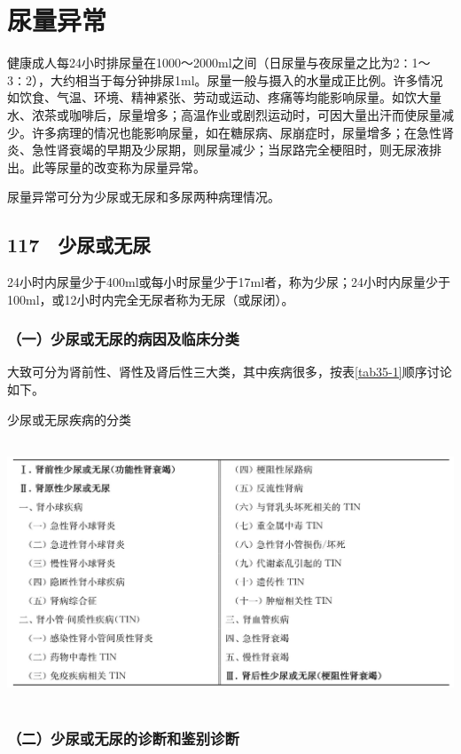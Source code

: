 \chapter{尿量异常}

健康成人每24小时排尿量在1000～2000ml之间（日尿量与夜尿量之比为2∶1～3∶2），大约相当于每分钟排尿1ml。尿量一般与摄入的水量成正比例。许多情况如饮食、气温、环境、精神紧张、劳动或运动、疼痛等均能影响尿量。如饮大量水、浓茶或咖啡后，尿量增多；高温作业或剧烈运动时，可因大量出汗而使尿量减少。许多病理的情况也能影响尿量，如在糖尿病、尿崩症时，尿量增多；在急性肾炎、急性肾衰竭的早期及少尿期，则尿量减少；当尿路完全梗阻时，则无尿液排出。此等尿量的改变称为尿量异常。

尿量异常可分为少尿或无尿和多尿两种病理情况。

\section{117　少尿或无尿}

24小时内尿量少于400ml或每小时尿量少于17ml者，称为少尿；24小时内尿量少于100ml，或12小时内完全无尿者称为无尿（或尿闭）。

\subsection{（一）少尿或无尿的病因及临床分类}

大致可分为肾前性、肾性及肾后性三大类，其中疾病很多，按表\ref{tab35-1}顺序讨论如下。

\begin{table}[htbp]
\centering
\caption{少尿或无尿疾病的分类}
\label{tab35-1}
\includegraphics[width=5.95833in,height=3.08333in]{./images/Image00210.jpg}
\end{table}

\subsection{（二）少尿或无尿的诊断和鉴别诊断}

